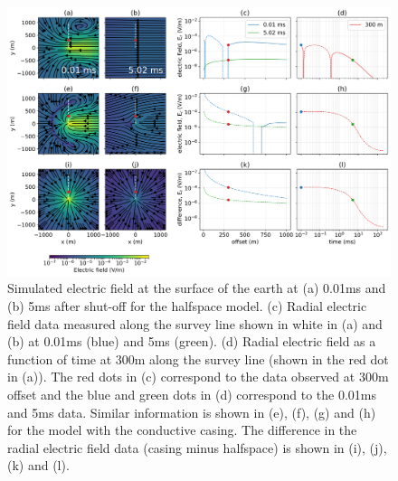 \begin{figure}
    \begin{center}
    \includegraphics[width=\textwidth]{figures/em_casing/surface_e_fields_overview.png}
    \end{center}
\caption{
    Simulated electric field at the surface of the earth at (a) 0.01ms and (b) 5ms after shut-off for the halfspace model.
    (c) Radial electric field data measured along the survey line shown in white in (a) and (b) at 0.01ms (blue) and 5ms (green).
    (d) Radial electric field as a function of time at 300m along the survey line (shown in the red dot in (a)).
    The red dots in (c) correspond to the data observed at 300m offset
    and the blue and green dots in (d) correspond to the 0.01ms and 5ms data.
    Similar information is shown in (e), (f), (g) and (h) for the model with the conductive casing.
    The difference in the radial electric field data (casing minus halfspace) is shown in (i), (j), (k) and (l).
}
\label{fig:surface_e_fields_overview}
\end{figure}



